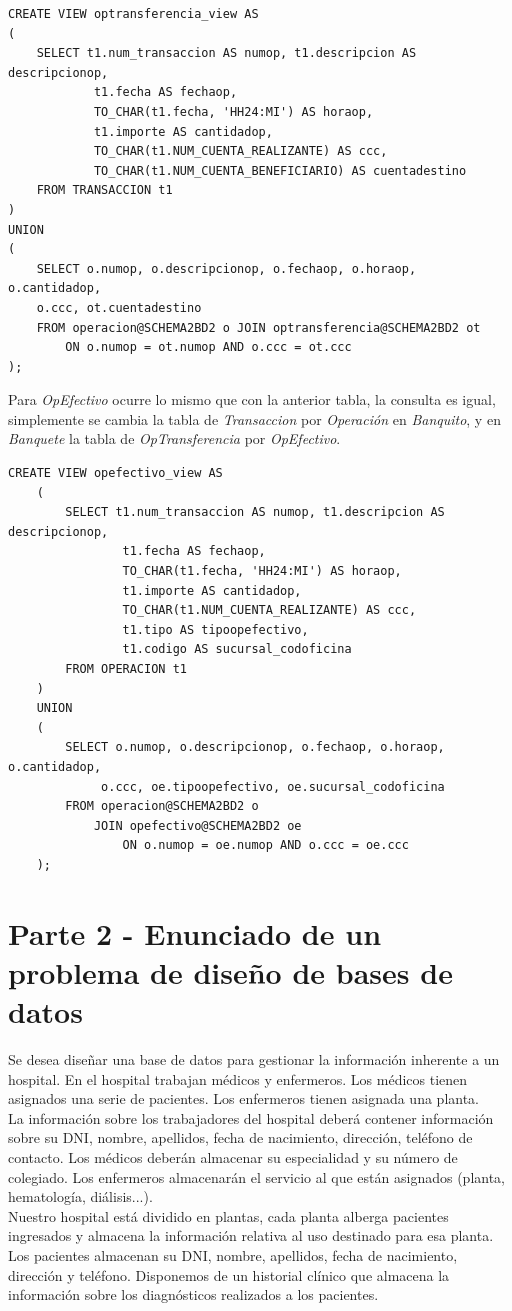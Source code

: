 \documentclass{article}
\begin{document}
\begin{lstlisting}
CREATE VIEW optransferencia_view AS
(
	SELECT t1.num_transaccion AS numop, t1.descripcion AS descripcionop, 
			t1.fecha AS fechaop, 
			TO_CHAR(t1.fecha, 'HH24:MI') AS horaop, 
			t1.importe AS cantidadop, 
			TO_CHAR(t1.NUM_CUENTA_REALIZANTE) AS ccc,
			TO_CHAR(t1.NUM_CUENTA_BENEFICIARIO) AS cuentadestino
	FROM TRANSACCION t1
)
UNION
(
	SELECT o.numop, o.descripcionop, o.fechaop, o.horaop, o.cantidadop, 
	o.ccc, ot.cuentadestino
	FROM operacion@SCHEMA2BD2 o JOIN optransferencia@SCHEMA2BD2 ot 
		ON o.numop = ot.numop AND o.ccc = ot.ccc
);
\end{lstlisting}
Para \textit{OpEfectivo} ocurre lo mismo que con la anterior tabla, la consulta es igual, simplemente se cambia la tabla de \textit{Transaccion } por \textit{Operación} en \emph{Banquito}, y en \emph{Banquete} la tabla de \textit{OpTransferencia } por \textit{OpEfectivo}.
\begin{lstlisting}
CREATE VIEW opefectivo_view AS
	(
		SELECT t1.num_transaccion AS numop, t1.descripcion AS descripcionop, 
				t1.fecha AS fechaop, 
				TO_CHAR(t1.fecha, 'HH24:MI') AS horaop, 
				t1.importe AS cantidadop, 
				TO_CHAR(t1.NUM_CUENTA_REALIZANTE) AS ccc,
				t1.tipo AS tipoopefectivo,
				t1.codigo AS sucursal_codoficina
		FROM OPERACION t1
	)
	UNION
	(
		SELECT o.numop, o.descripcionop, o.fechaop, o.horaop, o.cantidadop,
			 o.ccc, oe.tipoopefectivo, oe.sucursal_codoficina
		FROM operacion@SCHEMA2BD2 o 
			JOIN opefectivo@SCHEMA2BD2 oe 
				ON o.numop = oe.numop AND o.ccc = oe.ccc
	);
\end{lstlisting}
\newpage
\section{Parte 2 - Enunciado de un problema de diseño de bases de datos}

Se desea diseñar una base de datos para gestionar la información inherente a un hospital. En el hospital trabajan médicos y enfermeros. Los médicos tienen asignados una serie de pacientes. Los enfermeros tienen asignada una planta.\\
La información sobre los trabajadores del hospital deberá contener información sobre su DNI, nombre, apellidos, fecha de nacimiento, dirección, teléfono de contacto. Los médicos deberán almacenar su especialidad y su número de colegiado. Los enfermeros almacenarán el servicio al que están asignados (planta, hematología, diálisis...).\\
Nuestro hospital está dividido en plantas, cada planta alberga pacientes ingresados y almacena la información relativa al uso destinado para esa planta.\\
Los pacientes almacenan su DNI, nombre, apellidos, fecha de nacimiento, dirección y teléfono. Disponemos de un historial clínico que almacena la información sobre los diagnósticos realizados a los pacientes.
\end{document}

